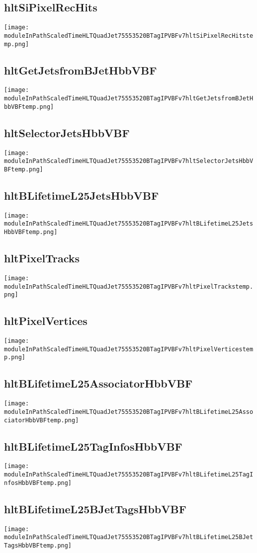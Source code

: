 \documentclass[10pt,a5paper,landscape]{report}
\begin{document}
\subsection{hltSiPixelRecHits} \centering \texttt{[image: moduleInPathScaledTimeHLTQuadJet75553520BTagIPVBFv7hltSiPixelRecHitstemp.png]}
\subsection{hltGetJetsfromBJetHbbVBF} \centering \texttt{[image: moduleInPathScaledTimeHLTQuadJet75553520BTagIPVBFv7hltGetJetsfromBJetHbbVBFtemp.png]}
\subsection{hltSelectorJetsHbbVBF} \centering \texttt{[image: moduleInPathScaledTimeHLTQuadJet75553520BTagIPVBFv7hltSelectorJetsHbbVBFtemp.png]}
\subsection{hltBLifetimeL25JetsHbbVBF} \centering \texttt{[image: moduleInPathScaledTimeHLTQuadJet75553520BTagIPVBFv7hltBLifetimeL25JetsHbbVBFtemp.png]}
\subsection{hltPixelTracks} \centering \texttt{[image: moduleInPathScaledTimeHLTQuadJet75553520BTagIPVBFv7hltPixelTrackstemp.png]}
\subsection{hltPixelVertices} \centering \texttt{[image: moduleInPathScaledTimeHLTQuadJet75553520BTagIPVBFv7hltPixelVerticestemp.png]}
\subsection{hltBLifetimeL25AssociatorHbbVBF} \centering \texttt{[image: moduleInPathScaledTimeHLTQuadJet75553520BTagIPVBFv7hltBLifetimeL25AssociatorHbbVBFtemp.png]}
\subsection{hltBLifetimeL25TagInfosHbbVBF} \centering \texttt{[image: moduleInPathScaledTimeHLTQuadJet75553520BTagIPVBFv7hltBLifetimeL25TagInfosHbbVBFtemp.png]}
\subsection{hltBLifetimeL25BJetTagsHbbVBF} \centering \texttt{[image: moduleInPathScaledTimeHLTQuadJet75553520BTagIPVBFv7hltBLifetimeL25BJetTagsHbbVBFtemp.png]}
\end{document}

